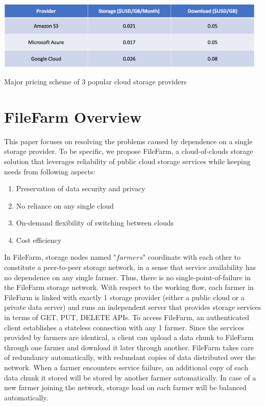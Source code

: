 \begin{table}[hbt]
\centering
  \includegraphics[width=13cm]{tables/table_cloud_storage_cost.png}
  \caption{Major pricing scheme of 3 popular cloud storage providers}
  \label{table:cloudstoragecost}
\end{table}

\section{FileFarm Overview}
\label{s:filefarmoverview}
This paper focuses on resolving the problems caused by dependence on a single storage provider. To be specific, we propose FileFarm, a cloud-of-clouds storage solution that leverages reliability of public cloud storage services while keeping needs from following aspects:

\begin{enumerate}
    \item Preservation of data security and privacy
    \item No reliance on any single cloud
    \item On-demand flexibility of switching between clouds
    \item Cost efficiency
\end{enumerate}

In FileFarm, storage nodes named "$farmers$" coordinate with each other to constitute a peer-to-peer storage network, in a sense that service availability has no dependence on any single farmer. Thus, there is no single-point-of-failure in the FileFarm storage network. With respect to the working flow, each farmer in FileFarm is linked with exactly 1 storage provider (either a public cloud or a private data server) and runs an independent server that provides storage services in terms of GET, PUT, DELETE APIs. To access FileFarm, an authenticated client establishes a stateless connection with any 1 farmer. Since the services provided by farmers are identical, a client can upload a data chunk to FileFarm through one farmer and download it later through another. FileFarm takes care of redundancy automatically, with redundant copies of data distributed over the network. When a farmer encounters service failure, an additional copy of each data chunk it stored will be stored by another farmer automatically. In case of a new farmer joining the network, storage load on each farmer will be balanced automatically.
